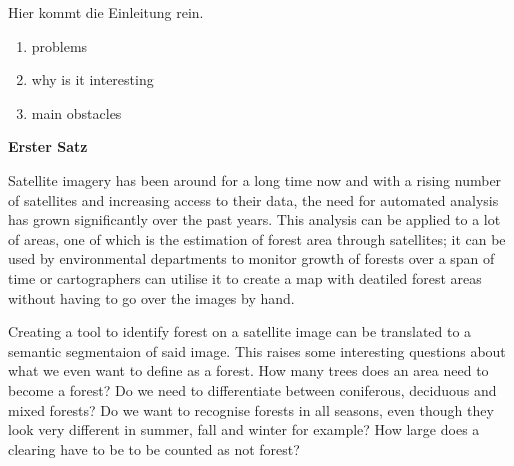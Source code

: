 Hier kommt die Einleitung rein.
\begin{enumerate}
  \item problems
  \item why is it interesting
  \item main obstacles
\end{enumerate}

\textbf{\color{red} Erster Satz}

Satellite imagery has been around for a long time now and with a rising number of satellites and increasing access to their data, the need for automated analysis has grown significantly over the past years. This analysis can be applied to a lot of areas, one of which is the estimation of forest area through satellites; it can be used by environmental departments to monitor growth of forests over a span of time or cartographers can utilise it to create a map with deatiled forest areas without having to go over the images by hand.

Creating a tool to identify forest on a satellite image can be translated to a semantic segmentaion of said image. This raises some interesting questions about what we even want to define as a forest. How many trees does an area need to become a forest? Do we need to differentiate between coniferous, deciduous and mixed forests? Do we want to recognise forests in all seasons, even though they look very different in summer, fall and winter for example? How large does a clearing have to be to be counted as not forest?
